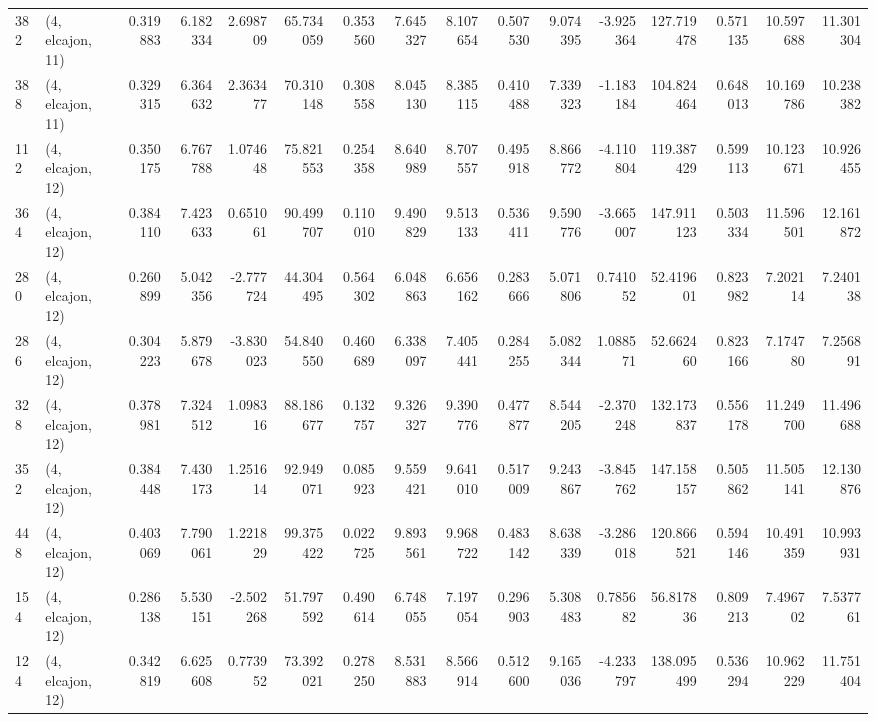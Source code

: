 \begin{tabular}{llrrrrrrrrrrrrrr}
382 &  (4, elcajon, 11) &   0.319883 &   6.182334 &   2.698709 &    65.734059 &   0.353560 &   7.645327 &   8.107654 &  0.507530 &   9.074395 &  -3.925364 &   127.719478 &   0.571135 &  10.597688 &  11.301304 \\
388 &  (4, elcajon, 11) &   0.329315 &   6.364632 &   2.363477 &    70.310148 &   0.308558 &   8.045130 &   8.385115 &  0.410488 &   7.339323 &  -1.183184 &   104.824464 &   0.648013 &  10.169786 &  10.238382 \\
112 &  (4, elcajon, 12) &   0.350175 &   6.767788 &   1.074648 &    75.821553 &   0.254358 &   8.640989 &   8.707557 &  0.495918 &   8.866772 &  -4.110804 &   119.387429 &   0.599113 &  10.123671 &  10.926455 \\
364 &  (4, elcajon, 12) &   0.384110 &   7.423633 &   0.651061 &    90.499707 &   0.110010 &   9.490829 &   9.513133 &  0.536411 &   9.590776 &  -3.665007 &   147.911123 &   0.503334 &  11.596501 &  12.161872 \\
280 &  (4, elcajon, 12) &   0.260899 &   5.042356 &  -2.777724 &    44.304495 &   0.564302 &   6.048863 &   6.656162 &  0.283666 &   5.071806 &   0.741052 &    52.419601 &   0.823982 &   7.202114 &   7.240138 \\
286 &  (4, elcajon, 12) &   0.304223 &   5.879678 &  -3.830023 &    54.840550 &   0.460689 &   6.338097 &   7.405441 &  0.284255 &   5.082344 &   1.088571 &    52.662460 &   0.823166 &   7.174780 &   7.256891 \\
328 &  (4, elcajon, 12) &   0.378981 &   7.324512 &   1.098316 &    88.186677 &   0.132757 &   9.326327 &   9.390776 &  0.477877 &   8.544205 &  -2.370248 &   132.173837 &   0.556178 &  11.249700 &  11.496688 \\
352 &  (4, elcajon, 12) &   0.384448 &   7.430173 &   1.251614 &    92.949071 &   0.085923 &   9.559421 &   9.641010 &  0.517009 &   9.243867 &  -3.845762 &   147.158157 &   0.505862 &  11.505141 &  12.130876 \\
448 &  (4, elcajon, 12) &   0.403069 &   7.790061 &   1.221829 &    99.375422 &   0.022725 &   9.893561 &   9.968722 &  0.483142 &   8.638339 &  -3.286018 &   120.866521 &   0.594146 &  10.491359 &  10.993931 \\
154 &  (4, elcajon, 12) &   0.286138 &   5.530151 &  -2.502268 &    51.797592 &   0.490614 &   6.748055 &   7.197054 &  0.296903 &   5.308483 &   0.785682 &    56.817836 &   0.809213 &   7.496702 &   7.537761 \\
124 &  (4, elcajon, 12) &   0.342819 &   6.625608 &   0.773952 &    73.392021 &   0.278250 &   8.531883 &   8.566914 &  0.512600 &   9.165036 &  -4.233797 &   138.095499 &   0.536294 &  10.962229 &  11.751404 \\

\end{tabular}
